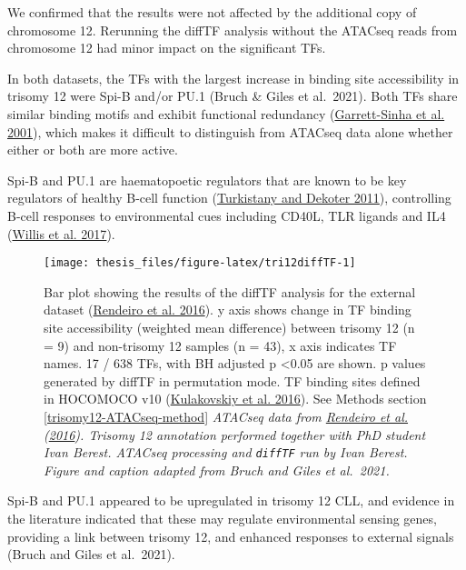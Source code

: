 \documentclass[11pt, a4paper, twosided]{book}
\begin{document}
We confirmed that the results were not affected by the additional copy of chromosome 12. Rerunning the diffTF analysis without the ATACseq reads from chromosome 12 had minor impact on the significant TFs.

In both datasets, the TFs with the largest increase in binding site accessibility in trisomy 12 were Spi-B and/or PU.1 (Bruch \& Giles et al.~2021). Both TFs share similar binding motifs and exhibit functional redundancy (\protect\hyperlink{ref-GarrettSinha2001}{Garrett-Sinha et al. 2001}), which makes it difficult to distinguish from ATACseq data alone whether either or both are more active.

Spi-B and PU.1 are haematopoetic regulators that are known to be key regulators of healthy B-cell function (\protect\hyperlink{ref-Turkistany2011}{Turkistany and Dekoter 2011}), controlling B-cell responses to environmental cues including CD40L, TLR ligands and IL4 (\protect\hyperlink{ref-Willis2017}{Willis et al. 2017}).


\begin{figure}

{\centering \texttt{[image: thesis\_files/figure-latex/tri12diffTF-1]} 

}

\caption{Bar plot showing the results of the diffTF analysis for the external dataset (\protect\hyperlink{ref-Rendeiro2016}{Rendeiro et al. 2016}). y axis shows change in TF binding site accessibility (weighted mean difference) between trisomy 12 (n = 9) and non-trisomy 12 samples (n = 43), x axis indicates TF names. 17 / 638 TFs, with BH adjusted p \textless0.05 are shown. p values generated by diffTF in permutation mode. TF binding sites defined in HOCOMOCO v10 (\protect\hyperlink{ref-HOCOMOCO}{Kulakovskiy et al. 2016}). See Methods section \ref{trisomy12-ATACseq-method} \emph{ATACseq data from \protect\hyperlink{ref-Rendeiro2016}{Rendeiro et al.} (\protect\hyperlink{ref-Rendeiro2016}{2016}). Trisomy 12 annotation performed together with PhD student Ivan Berest. ATACseq processing and \texttt{diffTF} run by Ivan Berest. Figure and caption adapted from Bruch and Giles et al.~2021.}}\label{fig:tri12diffTF}
\end{figure}
Spi-B and PU.1 appeared to be upregulated in trisomy 12 CLL, and evidence in the literature indicated that these may regulate environmental sensing genes, providing a link between trisomy 12, and enhanced responses to external signals (Bruch and Giles et al.~2021).
\end{document}
